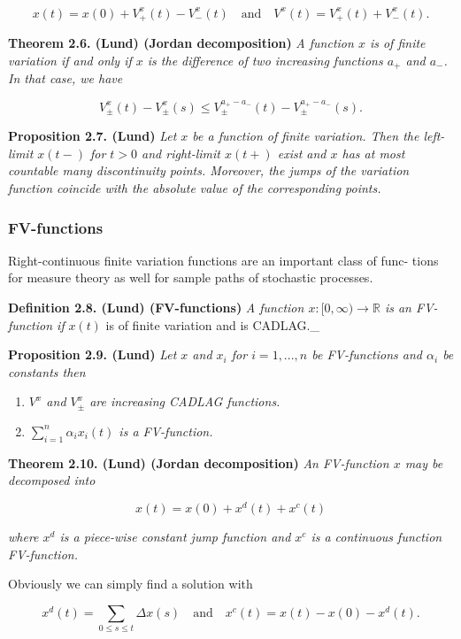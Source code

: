 \documentclass[a4paper,12pt,openany]{book}
\providecommand{\tightlist}{%
 \setlength{\itemsep}{0pt}\setlength{\parskip}{0pt}}
\begin{document}
\[
x(t)=x(0)+V_+^x(t)-V_-^x(t)\quad\text{and}\quad V^x(t)=V_+^x(t)+V_-^x(t).
\]

\textbf{Theorem 2.6. (Lund) (Jordan decomposition)} \emph{A function \(x\) is of finite variation if and only if \(x\) is the difference of two increasing functions \(a_+\) and \(a_-\). In that case, we have}

\[
V_{\pm}^x(t)-V_{\pm}^x(s)\le V_{\pm}^{a_+-a_-}(t)-V_{\pm}^{a_+-a_-}(s).
\]

\textbf{Proposition 2.7. (Lund)} \emph{Let \(x\) be a function of finite variation. Then the left-limit \(x(t-)\) for \(t>0\) and right-limit \(x(t+)\) exist and \(x\) has at most countable many discontinuity points. Moreover, the jumps of the variation function coincide with the absolute value of the corresponding points.}

\hypertarget{fv-functions}{%
\subsubsection{FV-functions}\label{fv-functions}}

Right-continuous finite variation functions are an important class of func- tions for measure theory as well for sample paths of stochastic processes.

\textbf{Definition 2.8. (Lund) (FV-functions)} \emph{A function \(x : [0,\infty) \to \mathbb R\) is an FV-function if }\(x(t)\) is of finite variation and is CADLAG.\_

\textbf{Proposition 2.9. (Lund)} \emph{Let \(x\) and \(x_i\) for \(i=1,...,n\) be FV-functions and \(\alpha_i\) be constants then}

\begin{enumerate}
\def\labelenumi{\roman{enumi})}
\tightlist
\item
  \emph{\(V^x\) and \(V_\pm^x\) are increasing CADLAG functions.}
\item
  \emph{\(\sum_{i=1}^n \alpha_ix_i(t)\) is a FV-function.}
\end{enumerate}

\textbf{Theorem 2.10. (Lund) (Jordan decomposition)} \emph{An FV-function \(x\) may be decomposed into}

\[
x(t)=x(0)+x^d(t)+x^c(t)
\]

\emph{where \(x^d\) is a piece-wise constant jump function and \(x^c\) is a continuous function FV-function.}

Obviously we can simply find a solution with

\[
x^d(t)=\sum_{0\le s\le t}\Delta x(s)\quad \text{and}\quad x^c(t)=x(t)-x(0)-x^d(t).
\]
\end{document}
